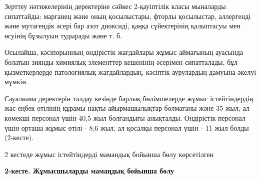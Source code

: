 Зерттеу нәтижелерінің деректеріне сәйкес 2-қауіптілік класы мыналарды
сипаттайды: марганец және оның қосылыстары, фторлы қосылыстар,
аллергенді және мутагендік әсері бар азот диоксиді, қаңқа сүйектерінің
қалыптасуы мен өсуінің бұзылуын тудырады және т. б.

Осылайша, кәсіпорынның өндірістік жағдайлары жұмыс аймағының ауасында
болатын зиянды химиялық элементтер кешенінің әсерімен сипатталады, бұл
қызметкерлерде патологиялық жағдайлардың, кәсіптік аурулардың дамуына
әкелуі мүмкін.

Сауалнама деректерін талдау кезінде барлық бөлімшелерде жұмыс
істейтіндердің жас-еңбек өтілінің құрамы нақты айырмашылықтар болмағаны
және 35 жыл, ал көмекші персонал үшін-40,5 жыл болғандығы анықталды.
Өндірістік персонал үшін орташа жұмыс өтілі - 8,6 жыл, ал қосалқы
персонал үшін - 11 жыл болды (2-кесте).

2 кестеде жұмыс істейтіндерді мамандық бойынша бөлу көрсетілген

{\bfseries 2-кесте. Жұмысшыларды мамаңдық бойынша бөлу}


